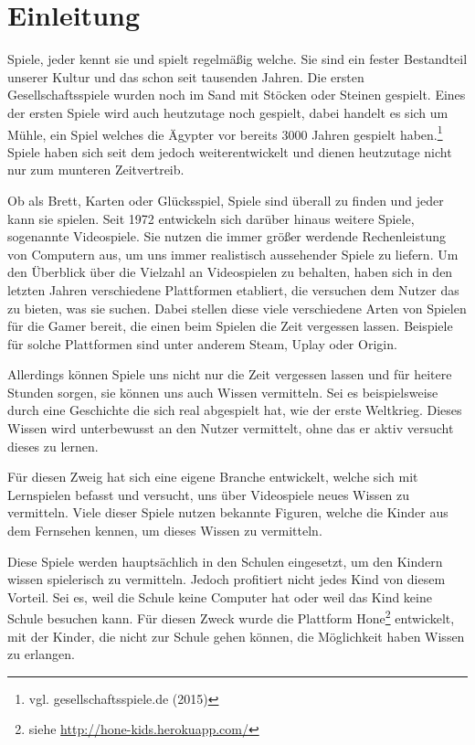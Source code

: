 \chapter{Einleitung}

Spiele, jeder kennt sie und spielt regelmäßig welche. Sie sind ein fester Bestandteil unserer Kultur und das schon seit tausenden Jahren. Die ersten Gesellschaftsspiele wurden noch im Sand mit Stöcken oder Steinen gespielt. Eines der ersten Spiele wird auch heutzutage noch gespielt, dabei handelt es sich um Mühle, ein Spiel welches die Ägypter vor bereits 3000 Jahren gespielt haben.\footnote{vgl. gesellschaftsspiele.de \cite{spiele} (2015)} Spiele haben sich seit dem jedoch weiterentwickelt und dienen heutzutage nicht nur zum munteren Zeitvertreib. 

Ob als Brett, Karten oder Glücksspiel, Spiele sind überall zu finden und jeder kann sie spielen. Seit 1972 entwickeln sich darüber hinaus weitere Spiele, sogenannte Videospiele. Sie nutzen die immer größer werdende Rechenleistung von Computern aus, um uns immer realistisch aussehender Spiele zu liefern. 
Um den Überblick über die Vielzahl an Videospielen zu behalten, haben sich in den letzten Jahren verschiedene Plattformen etabliert, die versuchen dem Nutzer das zu bieten, was sie suchen. Dabei stellen diese viele verschiedene Arten von Spielen für die Gamer bereit, die einen beim Spielen die Zeit vergessen lassen. Beispiele für solche Plattformen sind unter anderem Steam, Uplay oder Origin.

Allerdings können Spiele uns nicht nur die Zeit vergessen lassen und für heitere Stunden sorgen, sie können uns auch Wissen vermitteln. Sei es beispielsweise durch eine Geschichte die sich real abgespielt hat, wie der erste Weltkrieg. Dieses Wissen wird unterbewusst an den Nutzer vermittelt, ohne das er aktiv versucht dieses zu lernen.

Für diesen Zweig hat sich eine eigene Branche entwickelt, welche sich mit Lernspielen befasst und versucht, uns über Videospiele neues Wissen zu vermitteln. Viele dieser Spiele nutzen bekannte Figuren, welche die Kinder aus dem Fernsehen kennen, um dieses Wissen zu vermitteln.

Diese Spiele werden hauptsächlich in den Schulen eingesetzt, um den Kindern wissen spielerisch zu vermitteln. Jedoch profitiert nicht jedes Kind von diesem Vorteil. Sei es, weil die Schule keine Computer hat oder weil das Kind keine Schule besuchen kann. Für diesen Zweck wurde die Plattform Hone\footnote{siehe \url{http://hone-kids.herokuapp.com/}} entwickelt, mit der Kinder, die nicht zur Schule gehen können, die Möglichkeit haben Wissen zu erlangen. 

